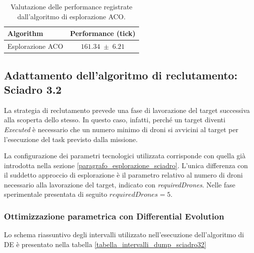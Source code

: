 \begin{table}[H]
    \centering
    \captionsetup{justification=centering, margin=2cm, font=footnotesize}
    \begin{tabular}{|l|c|}
    \hline
    \textbf{Algorithm}              & \textbf{Performance (tick)}              \\ \hline
    Esplorazione ACO                & $161.34 \; \pm \; 6.21$           \\ \hline
    \end{tabular}%
    
    \caption{Valutazione delle performance registrate dall'algoritmo di esplorazione ACO.}
    \label{tabella_performance_dump_ACO}
\end{table}


\subsection{Adattamento dell'algoritmo di reclutamento: \\Sciadro 3.2}

La strategia di reclutamento prevede una fase di lavorazione del target successiva alla scoperta dello stesso.
In questo caso, infatti, perché un target diventi \textit{Executed} è necessario che un numero minimo di droni si avvicini al target per l'esecuzione del task previsto dalla missione.

La configurazione dei parametri tecnologici utilizzata corrisponde con quella già introdotta nella sezione \ref{paragrafo_esplorazione_sciadro}.
L'unica differenza con il suddetto approccio di esplorazione è il parametro relativo al numero di droni necessario alla lavorazione del target, indicato con \textit{requiredDrones}.
Nelle fase sperimentale presentata di seguito $requiredDrones = 5$.

\subsubsection{Ottimizzazione parametrica con Differential Evolution}

Lo schema riassuntivo degli intervalli utilizzato nell'esecuzione dell'algoritmo di DE è presentato nella tabella \ref{tabella_intervalli_dump_sciadro32}

